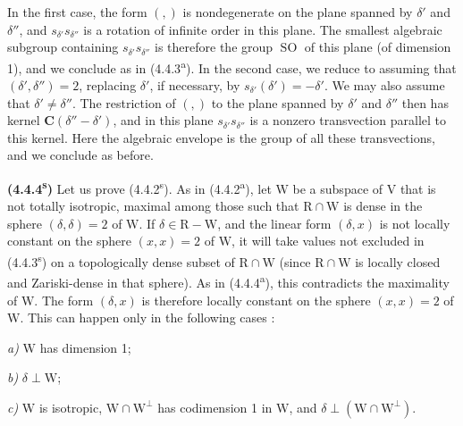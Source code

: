 \documentclass[11pt,leqno]{article}
\begin{document}
In the first case, the form \((,)\) is nondegenerate on the plane spanned by \(\delta'\) and \(\delta''\), and \(s_{\delta'}s_{\delta''}\) is a rotation of infinite order in this plane. The smallest algebraic subgroup containing \(s_{\delta'}s_{\delta''}\) is therefore the group \(\operatorname{SO}\) of this plane (of dimension 1), and we conclude as in (4.4.3\textsuperscript{a}). In the second case, we reduce to assuming that \((\delta',\delta'')=2\), replacing \(\delta'\), if necessary, by \(s_{\delta'}(\delta')=-\delta'\). We may also assume that \(\delta'\neq\delta''\). The restriction of \((,)\) to the plane spanned by \(\delta'\) and \(\delta''\) then has kernel \(\mathbf{C}(\delta''-\delta')\), and in this plane \(s_{\delta'}s_{\delta''}\) is a nonzero transvection parallel to this kernel. Here the algebraic envelope is the group of all these transvections, and we conclude as before.

\textbf{(4.4.4\textsuperscript{s})} Let us prove (4.4.2\textsuperscript{s}). As in (4.4.2\textsuperscript{a}), let \(\mathrm{W}\) be a subspace of \(\mathrm{V}\) that is not totally isotropic, maximal among those such that \(\mathrm{R}\cap\mathrm{W}\) is dense in the sphere \((\delta,\delta)=2\) of \(\mathrm{W}\). If \(\delta\in\mathrm{R}-\mathrm{W}\), and the linear form \((\delta,x)\) is not locally constant on the sphere \((x,x)=2\) of \(\mathrm{W}\), it will take values not excluded in (4.4.3\textsuperscript{s}) on a topologically dense subset of \(\mathrm{R}\cap\mathrm{W}\) (since \(\mathrm{R}\cap\mathrm{W}\) is locally closed and Zariski-dense in that sphere). As in (4.4.4\textsuperscript{a}), this contradicts the maximality of \(\mathrm{W}\). The form \((\delta,x)\) is therefore locally constant on the sphere \((x,x)=2\) of \(\mathrm{W}\). This can happen only in the following cases :
\par\noindent\textit{a)} \(\mathrm{W}\) has dimension 1;
\par\noindent\textit{b)} \(\delta\perp\mathrm{W}\);
\par\noindent\textit{c)} \(\mathrm{W}\) is isotropic, \(\mathrm{W}\cap\mathrm{W}^{\perp}\) has codimension 1 in \(\mathrm{W}\), and \(\delta\perp(\mathrm{W}\cap\mathrm{W}^{\perp})\).
\end{document}
